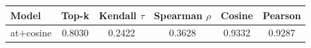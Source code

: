 \begin{tabular}{lccccc}
\toprule
Model & Top-k & Kendall $\tau$ & Spearman $\rho$ & Cosine & Pearson \\
\midrule
at+cosine & 0.8030 & 0.2422 & 0.3628 & 0.9332 & 0.9287 \\
\bottomrule
\end{tabular}
